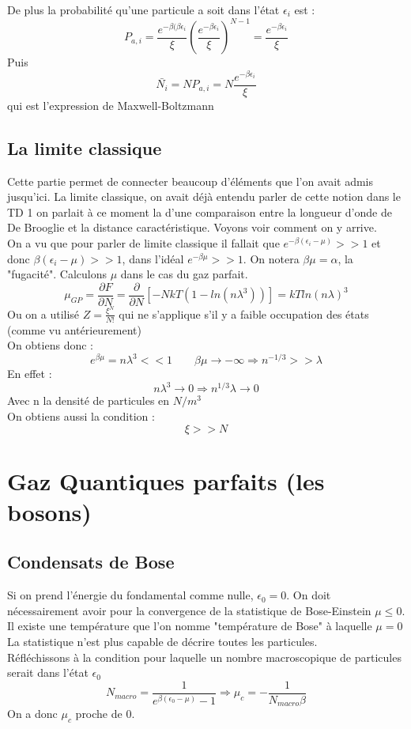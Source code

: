 De plus la probabilité qu'une particule a soit dans l'état $\epsilon_i$ est :
$$P_{a,i}=\frac{e^{-\beta  (\beta\epsilon_i}}{\xi}\left(\frac{e^{-\beta\epsilon_i}}{\xi}\right)^{N-1}=\frac{e^{-\beta\epsilon_i}}{\xi}$$
Puis 
$$\bar{N_i}=NP_{a,i}=N\frac{e^{-\beta\epsilon_i}}{\xi}$$
qui est l'expression de Maxwell-Boltzmann

\subsection{La limite classique}

Cette partie permet de connecter beaucoup d'éléments que l'on avait admis jusqu'ici. La limite classique, on avait déjà entendu parler de cette notion dans le TD 1 on parlait à ce moment la d'une comparaison entre la longueur d'onde de De Brooglie et la distance caractéristique. Voyons voir comment on y arrive.\\

On a vu que pour parler de limite classique il fallait que $e^{-\beta(\epsilon_i-\mu)}>>1$ et donc $\beta(\epsilon_i-\mu)>>1$, dans l'idéal $e^{-\beta\mu}>>1$. On notera $\beta\mu=\alpha$, la "fugacité". Calculons $\mu$ dans le cas du gaz parfait.
$$\mu_{GP}=\frac{\partial F}{\partial N}=\frac{\partial }{\partial N}[-NkT(1-ln(n\lambda^3))]=kTln(n\lambda)^3$$
Ou on a utilisé $Z=\frac{\xi^N}{N!}$ qui ne s'applique s'il y a faible occupation des états (comme vu antérieurement)\\
On obtiens donc :
$$e^{\beta\mu}=n\lambda^3<<1 \qquad \beta\mu \rightarrow -\infty \Rightarrow n^{-1/3}>>\lambda$$
En effet :
$$n\lambda^3\rightarrow 0 \Rightarrow n^{1/3}\lambda\rightarrow 0$$
Avec n la densité de particules en $N/m^3$
\\
On obtiens aussi la condition :
$$\xi>>N$$


\section{Gaz Quantiques parfaits (les bosons)}


\subsection{Condensats de Bose}

Si on prend l'énergie du fondamental comme nulle, $\epsilon_0=0$. On doit nécessairement avoir pour la convergence de la statistique de Bose-Einstein $\mu \leq 0$. Il existe une température que l'on nomme "température de Bose" à laquelle $\mu = 0$ La statistique n'est plus capable de décrire toutes les particules. \\
Réfléchissons à la condition pour laquelle un nombre macroscopique de particules serait dans l'état $\epsilon_0$
$$N_{macro}=\frac{1}{e^{\beta (\epsilon_0 -\mu)}-1} \Rightarrow\mu_c=-\frac{1}{N_{macro}\beta}$$
On a donc $\mu_c$ proche de 0.\\

